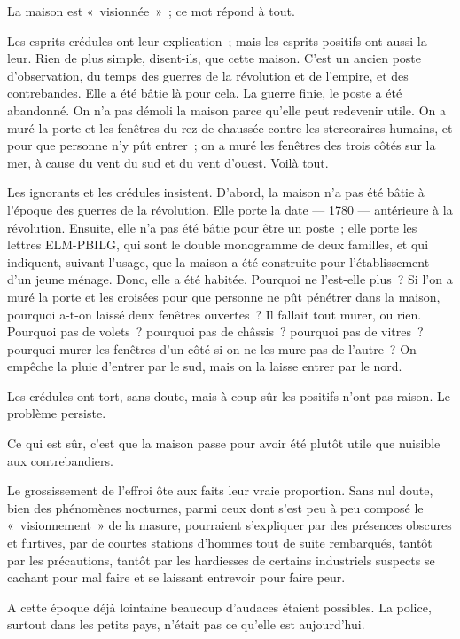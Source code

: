 \documentclass[french,twoside]{book} %
\begin{document}
La maison est « visionnée » ; ce mot répond à tout.\par
Les esprits crédules ont leur explication ; mais les esprits positifs ont aussi la leur. Rien de plus simple, disent-ils, que cette maison. C’est un ancien poste d’observation, du temps des guerres de la révolution et de l’empire, et des contrebandes. Elle a été bâtie là pour cela. La guerre finie, le poste a été abandonné. On n’a pas démoli la maison parce qu’elle peut redevenir utile. On a muré la porte et les fenêtres du rez-de-chaussée contre les stercoraires humains, et pour que personne n’y pût entrer ; on a muré les fenêtres des trois côtés sur la mer, à cause du vent du sud et du vent d’ouest. Voilà tout.\par
Les ignorants et les crédules insistent. D’abord, la maison n’a pas été bâtie à l’époque des guerres de la révolution. Elle porte la date — 1780 — antérieure à la révolution. Ensuite, elle n’a pas été bâtie pour être un poste ; elle porte les lettres ELM-PBILG, qui  sont le double monogramme de deux familles, et qui indiquent, suivant l’usage, que la maison a été construite pour l’établissement d’un jeune ménage. Donc, elle a été habitée. Pourquoi ne l’est-elle plus ? Si l’on a muré la porte et les croisées pour que personne ne pût pénétrer dans la maison, pourquoi a-t-on laissé deux fenêtres ouvertes ? Il fallait tout murer, ou rien. Pourquoi pas de volets ? pourquoi pas de châssis ? pourquoi pas de vitres ? pourquoi murer les fenêtres d’un côté si on ne les mure pas de l’autre ? On empêche la pluie d’entrer par le sud, mais on la laisse entrer par le nord.\par
Les crédules ont tort, sans doute, mais à coup sûr les positifs n’ont pas raison. Le problème persiste.\par
Ce qui est sûr, c’est que la maison passe pour avoir été plutôt utile que nuisible aux contrebandiers.\par
Le grossissement de l’effroi ôte aux faits leur vraie proportion. Sans nul doute, bien des phénomènes nocturnes, parmi ceux dont s’est peu à peu composé le « visionnement » de la masure, pourraient s’expliquer par des présences obscures et furtives, par de courtes stations d’hommes tout de suite rembarqués, tantôt par les précautions, tantôt par les hardiesses de certains industriels suspects se cachant pour mal faire et se laissant entrevoir pour faire peur.\par
A cette époque déjà lointaine beaucoup d’audaces étaient possibles. La police, surtout dans les petits pays, n’était pas ce qu’elle est aujourd’hui.\par
\end{document}
